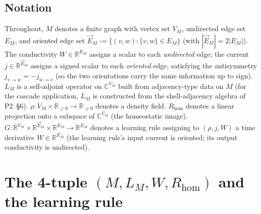 \documentclass[11pt]{article}
\theoremstyle{definition}
\newcommand{\R}{\mathbb{R}}
\newcommand{\C}{\mathbb{C}}
\begin{document}
\subsection{Notation}

Throughout, $M$ denotes a finite graph with vertex set $V_M$, undirected edge set $E_M$, and oriented edge set $\vec E_M := \{(v,w) : \{v,w\} \in E_M\}$ (with $|\vec E_M| = 2|E_M|$). The conductivity $W \in \R^{E_M}$ assigns a scalar to each \emph{undirected} edge; the current $j \in \R^{\vec E_M}$ assigns a signed scalar to each \emph{oriented} edge, satisfying the antisymmetry $j_{v\to w} = -j_{w \to v}$ (so the two orientations carry the same information up to sign).
$L_M$ is a self-adjoint operator on $\C^{V_M}$ built from adjacency-type data on $M$ (for the cascade application, $L_M$ is constructed from the shell-adjacency algebra of P2~\S 6).
$\rho: V_M \times \R_{\geq 0} \to \R_{\geq 0}$ denotes a density field.
$R_{\mathrm{hom}}$ denotes a linear projection onto a subspace of $\C^{V_M}$ (the homeostatic image).
$G: \R^{V_M} \times \R^{\vec E_M} \times \R^{E_M} \to \R^{E_M}$ denotes a learning rule assigning to $(\rho, j, W)$ a time derivative $\dot W \in \R^{E_M}$ (the learning rule's input current is oriented; its output conductivity is undirected).

\section{The 4-tuple $(M, L_M, W, R_{\mathrm{hom}})$ and the learning rule}\label{sec:4tuple}
\end{document}
